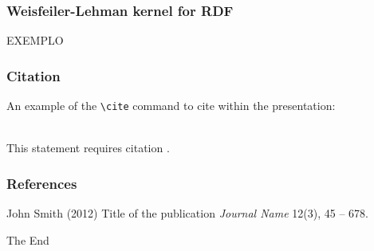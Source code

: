 \documentclass{beamer}
\begin{document}

\begin{frame}
\frametitle{Weisfeiler-Lehman kernel for RDF}

EXEMPLO

\end{frame}


\begin{frame}[fragile] %
\frametitle{Citation}
An example of the \verb|\cite| command to cite within the presentation:\\~

This statement requires citation \cite{p1}.
\end{frame}


\begin{frame}
\frametitle{References}
\footnotesize{
\begin{thebibliography}{99} %
 John Smith (2012)
\newblock Title of the publication
\newblock \emph{Journal Name} 12(3), 45 -- 678.
\end{thebibliography}
}
\end{frame}


\begin{frame}
\Huge{\centerline{The End}}
\end{frame}

\end{document}

